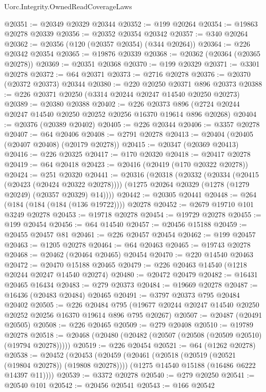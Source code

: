 \begin{lexlean}{Uorc.Integrity.OwnedReadCoverageLaws}
\begin{coremodule}
@20351 := @20349 @20329 @20344
@20352 := @199 @20264
@20354 := @19863 @20278 @20339
@20356 := @20352 @20354 @20342
@20357 := @340 @20264
@20362 := @20356 (@120 (@20357 @20354) (@344 @20264))
@20364 := @226 @20342 @20354
@20365 := @19876 @20339
@20368 := @20362 (@20364 (@20365 @20278))
@20369 := @20351 @20368
@20370 := @199 @20329
@20371 := @3301 @20278
@20372 := @64 @20371
@20373 := @2716 @20278
@20376 := @20370 (@20372 @20373) @20344
@20380 := @220 @20250 @20371 @896 @20373
@20388 := @226 @20371 @20250 (@3314 @20244 @20247 @14540 @20250 @20273)
@20389 := @20380 @20388
@20402 := @226
    @20373
    @896
    (@2724 @20244 @20247 @14540 @20250 @20252 @20256 @16370 @19614 @896 @20268)
@20404 := @20376 (@20389 @20402)
@20405 := @226 @20344
@20406 := @3357 @20278
@20407 := @64 @20406
@20408 := @2791 @20278
@20413 := @20404 (@20405 (@20407 @20408) (@20179 @20278))
@20415 := @20347 (@20369 @20413)
@20416 := @226 @20325
@20417 := @170 @20320
@20418 := @20417 @20278
@20419 := @64 @20418
@20423 := @20416 (@20419 (@170 @20322 @20278))
@20424 := @251 @20320
@20441 := @20316
    (@20318
      (@20332
        (@20334 (@20415 (@20423 (@20424 @20322 @20278))))
        (@1275 @20264 @20329 (@1278 (@1279 @20249) (@20357 @20329) @14))))
@20442 := @20305 @20441
@20448 := @264 (@184 (@184 (@184 (@136 @19722)))) @20278
@20452 := @2679 @19710 @101 @3249 @20278
@20453 := @19718 @20278
@20454 := @19729 @20278
@20455 := @199 @20454
@20456 := @64 @14540
@20457 := @20456 @15188
@20459 := @20455 @20457 @81
@20461 := @226 @20457 @20454
@20462 := @199 @20457
@20463 := @1205 @20278
@20464 := @64 @20463
@20465 := @19743 @20278
@20468 := @20462 (@20464 @20465) @20454
@20470 := @220 @14540 @20463
@20472 := @20470 @15188 @20465
@20479 := @226 @20463 @14540 (@1218 @20244 @20247 @14540 @20274)
@20480 := @20472 @20479
@20482 := @16431 @20465 @16434
@20483 := @279 @20373
@20484 := @19669 @20278
@20487 := @16436 (@20483 @20484) @20465
@20491 := @3797 @20373 @795 @20484 @20402
@20505 := @226
    @20484
    @795
    (@19677 @20244 @20247 @14540 @20250 @20252 @20256 @16370 @19614 @896 @795 @20267)
@20507 := @20487 (@20491 @20505)
@20508 := @226 @20465
@20509 := @279 @20408
@20510 := @19789 @20278
@20518 := @20468 (@20480 (@20482 (@20507 (@20508 (@20509 @20510) (@19794 @20278)))))
@20519 := @226 @20454
@20521 := @64 (@1262 @20278)
@20538 := @20452
    (@20453
      (@20459
        (@20461 (@20518 (@20519 (@20521 (@19804 @20278)) (@19808 @20278))))
        (@1275 @14540 @15188 (@16486 @6222 @14397 @11))))
@20539 := @3372 @20278
@20540 := @279 @20250
@20541 := @20540 @101
@20542 := @20456 @20541
@20543 := @166 @20542

\end{coremodule}
\end{lexlean}
